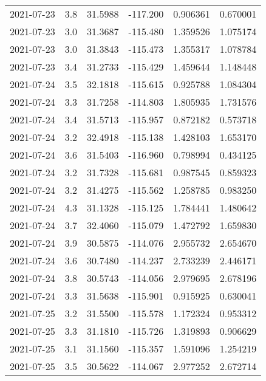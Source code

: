 \begin{tabular}{lrrrrr}
2021-07-23 &       3.8 &  31.5988 &  -117.200 &         0.906361 &         0.670001 \\
2021-07-23 &       3.0 &  31.3687 &  -115.480 &         1.359526 &         1.075174 \\
2021-07-23 &       3.0 &  31.3843 &  -115.473 &         1.355317 &         1.078784 \\
2021-07-23 &       3.4 &  31.2733 &  -115.429 &         1.459644 &         1.148448 \\
2021-07-24 &       3.5 &  32.1818 &  -115.615 &         0.925788 &         1.084304 \\
2021-07-24 &       3.3 &  31.7258 &  -114.803 &         1.805935 &         1.731576 \\
2021-07-24 &       3.4 &  31.5713 &  -115.957 &         0.872182 &         0.573718 \\
2021-07-24 &       3.2 &  32.4918 &  -115.138 &         1.428103 &         1.653170 \\
2021-07-24 &       3.6 &  31.5403 &  -116.960 &         0.798994 &         0.434125 \\
2021-07-24 &       3.2 &  31.7328 &  -115.681 &         0.987545 &         0.859323 \\
2021-07-24 &       3.2 &  31.4275 &  -115.562 &         1.258785 &         0.983250 \\
2021-07-24 &       4.3 &  31.1328 &  -115.125 &         1.784441 &         1.480642 \\
2021-07-24 &       3.7 &  32.4060 &  -115.079 &         1.472792 &         1.659830 \\
2021-07-24 &       3.9 &  30.5875 &  -114.076 &         2.955732 &         2.654670 \\
2021-07-24 &       3.6 &  30.7480 &  -114.237 &         2.733239 &         2.446171 \\
2021-07-24 &       3.8 &  30.5743 &  -114.056 &         2.979695 &         2.678196 \\
2021-07-24 &       3.3 &  31.5638 &  -115.901 &         0.915925 &         0.630041 \\
2021-07-25 &       3.2 &  31.5500 &  -115.578 &         1.172324 &         0.953312 \\
2021-07-25 &       3.3 &  31.1810 &  -115.726 &         1.319893 &         0.906629 \\
2021-07-25 &       3.1 &  31.1560 &  -115.357 &         1.591096 &         1.254219 \\
2021-07-25 &       3.5 &  30.5622 &  -114.067 &         2.977252 &         2.672714 \\

\end{tabular}
